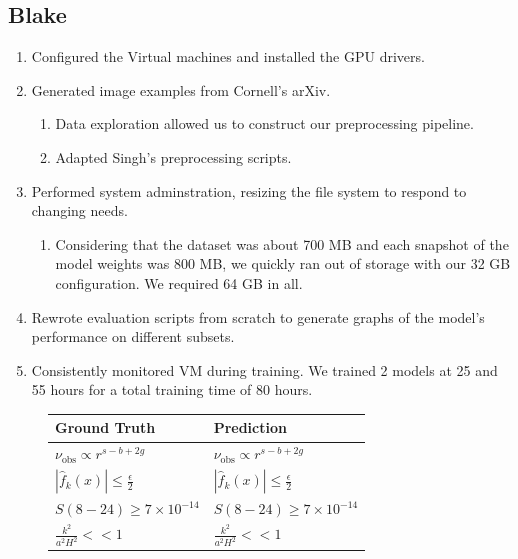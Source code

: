 \documentclass[12pt]{article}
\begin{document}
\begin{appendix}
    \subsection{Blake}
      \begin{enumerate}
        \item Configured the Virtual machines and installed the GPU drivers.
        \item Generated image examples from Cornell's arXiv.
        \begin{enumerate}
          \item Data exploration allowed us to construct our preprocessing pipeline.
          \item Adapted Singh's preprocessing scripts.
        \end{enumerate}
        \item Performed system adminstration, resizing the file system to
        respond to changing needs. 
        \begin{enumerate}
          \item Considering that the dataset was about 700 MB and each snapshot
          of the model weights was 800 MB, we quickly ran out of storage with
          our 32 GB configuration. We required 64 GB in all.
        \end{enumerate}
        \item Rewrote evaluation scripts from scratch to generate graphs of the
        model's performance on different subsets.
      \item Consistently monitored VM during training. We trained 2 models at 25
      and 55 hours for a total training time of 80 hours.
      \end{enumerate}
\begin{figure}[!ht]
\begin{center}
\begin{longtable}{ l l }
\toprule
  Ground Truth & Prediction  \tabularnewline
\midrule
\endhead
$\nu _ { \mathrm { o b s } } \propto r ^ { s - b + 2 g } $&$\nu _ { \mathrm { o b s } } \propto r ^ { s - b + 2 g } $ \\
$| \widehat { f } _ { k } ( x ) | \leq \frac { \epsilon } { 2 } $ & $| \widehat { f } _ { k } ( x ) | \leq \frac { \epsilon } { 2 } $\\
$S ( 8 - 2 4 ) \geq 7 \times 1 0 ^ { - 1 4 } $&$S ( 8 - 2 4 ) \geq 7 \times 1 0 ^ { - 1 4 } $ \\
$\frac { k ^ { 2 } } { a ^ { 2 } H ^ { 2 } } < < 1 $&$\frac { k ^ { 2 } } { a ^ { 2 } H ^ { 2 } } < < 1 $ \\

\end{longtable}
\end{center}
\end{figure}
\end{appendix}
\end{document}
